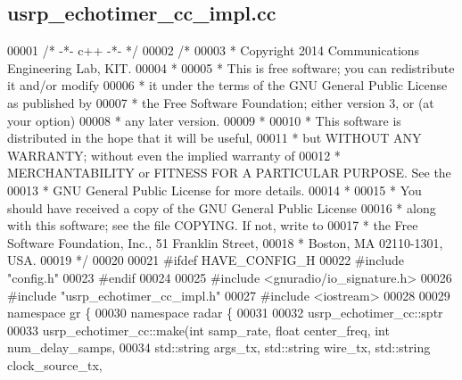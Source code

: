 \subsection{usrp\+\_\+echotimer\+\_\+cc\+\_\+impl.\+cc}
\label{usrp__echotimer__cc__impl_8cc_source}

\begin{DoxyCode}
00001 \textcolor{comment}{/* -*- c++ -*- */}
00002 \textcolor{comment}{/*}
00003 \textcolor{comment}{ * Copyright 2014 Communications Engineering Lab, KIT.}
00004 \textcolor{comment}{ *}
00005 \textcolor{comment}{ * This is free software; you can redistribute it and/or modify}
00006 \textcolor{comment}{ * it under the terms of the GNU General Public License as published by}
00007 \textcolor{comment}{ * the Free Software Foundation; either version 3, or (at your option)}
00008 \textcolor{comment}{ * any later version.}
00009 \textcolor{comment}{ *}
00010 \textcolor{comment}{ * This software is distributed in the hope that it will be useful,}
00011 \textcolor{comment}{ * but WITHOUT ANY WARRANTY; without even the implied warranty of}
00012 \textcolor{comment}{ * MERCHANTABILITY or FITNESS FOR A PARTICULAR PURPOSE.  See the}
00013 \textcolor{comment}{ * GNU General Public License for more details.}
00014 \textcolor{comment}{ *}
00015 \textcolor{comment}{ * You should have received a copy of the GNU General Public License}
00016 \textcolor{comment}{ * along with this software; see the file COPYING.  If not, write to}
00017 \textcolor{comment}{ * the Free Software Foundation, Inc., 51 Franklin Street,}
00018 \textcolor{comment}{ * Boston, MA 02110-1301, USA.}
00019 \textcolor{comment}{ */}
00020 
00021 \textcolor{preprocessor}{#ifdef HAVE\_CONFIG\_H}
00022 \textcolor{preprocessor}{#include "config.h"}
00023 \textcolor{preprocessor}{#endif}
00024 
00025 \textcolor{preprocessor}{#include <gnuradio/io\_signature.h>}
00026 \textcolor{preprocessor}{#include "usrp_echotimer_cc_impl.h"}
00027 \textcolor{preprocessor}{#include <iostream>}
00028 
00029 \textcolor{keyword}{namespace }gr \{
00030   \textcolor{keyword}{namespace }radar \{
00031 
00032     usrp_echotimer_cc::sptr
00033     usrp_echotimer_cc::make(\textcolor{keywordtype}{int} samp_rate, \textcolor{keywordtype}{float} center_freq, \textcolor{keywordtype}{int} num\_delay\_samps,
00034         std::string args\_tx, std::string wire\_tx, std::string clock\_source\_tx, 

\end{DoxyCode}
